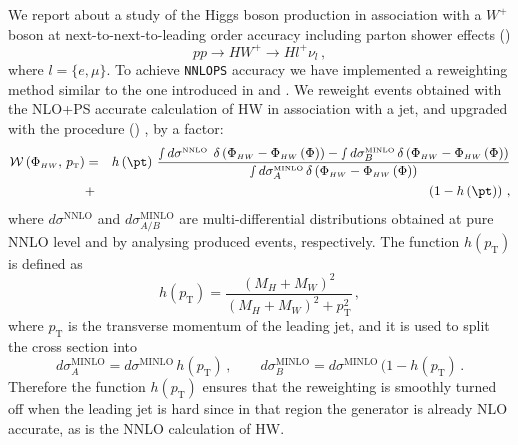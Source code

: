 We report about a study of the Higgs boson production in association with a $W^{+}$
boson at next-to-next-to-leading order accuracy including parton
shower effects (\NNLOPS{}) %
\begin{equation}
  pp\rightarrow HW^{+} \rightarrow H l^{+}\nu_{l}\,,
  \label{eq:def-process}
\end{equation}
where $l = \{e,\mu\}$.
To achieve \texttt{NNLOPS} accuracy we have implemented a reweighting
method similar to the one introduced in \HNNLOPS{}
\cite{Hamilton:2013fea} and \DYNNLOPS{} \cite{Karlberg:2014qua}. We
reweight events obtained with the \POWHEG{} NLO+PS accurate
calculation of HW in association with a jet, and upgraded with the
\MINLO{} procedure (\HWJMINLO{}) \cite{Luisoni:2013kna}, by a factor:
\begin{eqnarray} 
  \mathcal{W}\left(\PhiHWsimp,\, p_{{\scriptscriptstyle
      \mathrm{T}}}\right)&=&h\left(\pt\right)\,\frac{\smallint
    d\sigma^{{\scriptscriptstyle
        \mathrm{NNLO\phantom{i}}}}\,\delta\left(\PhiHWsimp-\PhiHWsimp\left(\Phi\right)\right)-\smallint
    d\sigma_{B}^{{\scriptscriptstyle
        \mathrm{MINLO}}}\,\delta\left(\PhiHWsimp-\PhiHWsimp\left(\Phi\right)\right)}{\smallint
    d\sigma_{A}^{{\scriptscriptstyle
        \mathrm{MINLO}}}\,\delta\left(\PhiHWsimp-\PhiHWsimp\left(\Phi\right)\right)}\nonumber\\ &+&\left(1-h\left(\pt\right)\right)\,,\label{eq:W}
\end{eqnarray}
where $d\sigma^{\mathrm{NNLO}}$ and $d\sigma_{A/B}^{\mathrm{MINLO}}$
are multi-differential distributions obtained at pure NNLO level and
by analysing produced \HWJMINLO{} events, respectively. The function
$h(p_{\scriptscriptstyle\mathrm{T}})$ is defined as
\begin{equation}
h(p_\mathrm{T}) = \frac{(M_{H}+M_W)^2}{(M_{H}+M_W)^2+p_\mathrm{T}^2}\,, \label{eq:h_pt}
\end{equation}
where $p_{\scriptscriptstyle\mathrm{T}}$ is the transverse momentum of
the leading jet, and it is used to split the \MINLO{} cross section
into
%
\begin{equation} d\sigma_A^{\scriptscriptstyle\mathrm{MINLO}} =d
\sigma^{\scriptscriptstyle\mathrm{MINLO}}\,
h(p_{\scriptscriptstyle\mathrm{T}})\,,\qquad
d\sigma_B^{\scriptscriptstyle\mathrm{MINLO}} =
d\sigma^{\scriptscriptstyle\mathrm{MINLO}}\,
(1-h(p_{\scriptscriptstyle\mathrm{T}})\,.
\end{equation}
Therefore the function $h(p_{\scriptscriptstyle\mathrm{T}})$ ensures that the
reweighting is smoothly turned off when the leading jet is hard since
in that region the \HWJMINLO{} generator is already NLO accurate, as
is the NNLO calculation of HW.

